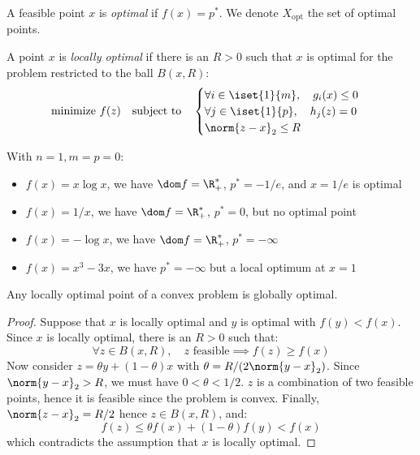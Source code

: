 \begin{definition}
    A feasible point $x$ is \emph{optimal} if $f(x)=p^*$. We denote $X_{\text{opt}}$ the set of optimal points.
\end{definition}

\begin{definition}
    A point $x$ is \emph{locally optimal} if there is an $R>0$ such that $x$ is optimal for the problem restricted to the ball $B(x, R)$:
    \begin{equation*}
        \text{minimize } f(z) \quad\text{subject to}\quad \begin{cases}
            \forall i\in\iset{1}{m}, \quad g_i(x)\leq 0\\
            \forall j\in\iset{1}{p}, \quad h_j(z) = 0\\
            \norm{z-x}_2\leq R
        \end{cases}
    \end{equation*}
\end{definition}

\begin{example}
    With $n=1, m=p=0$:
    \begin{itemize}
        \item $f(x)=x\log x$, we have $\dom f=\R_+^*$, $p^*=-1/e$, and $x=1/e$ is optimal
        \item $f(x)=1/x$, we have $\dom f=\R_+^*$, $p^*=0$, but no optimal point
        \item $f(x)=-\log x$, we have $\dom f=\R_+^*$, $p^*=-\infty$
        \item $f(x)=x^3-3x$, we have $p^*=-\infty$ but a local optimum at $x=1$
    \end{itemize}
\end{example}

\begin{theorem}
    Any locally optimal point of a convex problem is globally optimal.
\end{theorem}
\begin{proof}
    Suppose that $x$ is locally optimal and $y$ is optimal with $f(y)<f(x)$. Since $x$ is locally optimal, there is an $R>0$ such that:
    \begin{equation*}
        \forall z\in B(x, R), \quad z\text{ feasible} \implies f(z)\geq f(x)
    \end{equation*}
    Now consider $z=\theta y + (1-\theta)x$ with $\theta=R/(2\norm{y-x}_2)$. Since $\norm{y-x}_2>R$, we must have $0<\theta<1/2$. $z$ is a combination of two feasible points, hence it is feasible since the problem is convex. Finally, $\norm{z-x}_2=R/2$ hence $z\in B(x, R)$, and:
    \begin{equation*}
        f(z)\leq\theta f(x)+(1-\theta)f(y)<f(x)
    \end{equation*}
    which contradicts the assumption that $x$ is locally optimal.
\end{proof}

